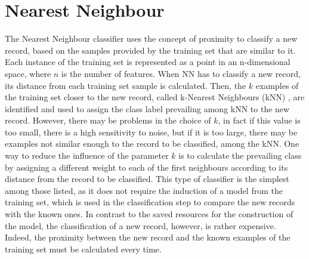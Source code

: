 \documentclass[final,a4paper,12pt,english]{UnicaPhdThesis3}
\begin{document}
	\section{Nearest Neighbour} \label{kNN}
	The Nearest Neighbour classifier uses the concept of proximity to classify a new record, based on the samples provided by the training set that are similar to it. Each instance of the training set is represented as a point in an n-dimensional space, where $n$ is the number of features. When NN has to classify a new record, its distance from each training set sample is calculated. Then, the $k$ examples of the training set closer to the new record, called k-Nearest Neighbours (k\acs{NN})  \cite{Cover}, are identified and used to assign the class label prevailing among kNN to the new record. However, there may be problems in the choice of $k$, in fact if this value is too small, there is a high sensitivity to noise, but if it is too large, there may be examples not similar enough to the record to be classified, among the kNN. One way to reduce the influence of the parameter $k$ is to calculate the prevailing class by assigning a different weight to each of the first neighbours according to its distance from the record to be classified. This type of classifier is the simplest among those listed, as it does not require the induction of a model from the training set, which is used in the classification step to compare the new records with the known ones. In contrast to the saved resources for the construction of the model, the classification of a new record, however, is rather expensive. Indeed, the proximity between the new record and the known examples of the training set must be calculated every time.
	
\end{document}
